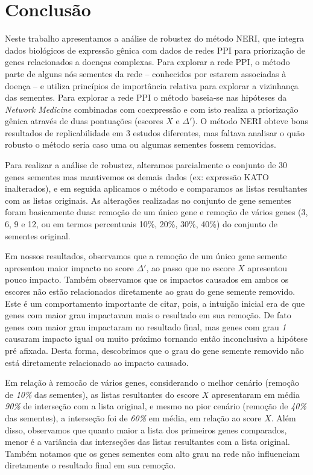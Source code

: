 \chapter{Conclusão}

Neste trabalho apresentamos a análise de robustez do método NERI, que integra dados biológicos de expressão gênica com dados de redes PPI para priorização de genes relacionados a doenças complexas.
Para explorar a rede PPI, o método parte de alguns nós sementes da rede -- conhecidos por estarem associadas à doença -- e utiliza princípios de importância relativa para explorar a vizinhança das sementes. 
Para explorar a rede PPI o método baseia-se nas hipóteses da \textsl{Network Medicine} combinadas com coexpressão e com isto realiza a priorização gênica através de duas pontuações (escores $X$ e $\Delta'$).
O método NERI obteve bons resultados de replicabilidade em 3 estudos diferentes, mas faltava analisar o quão robusto o método seria caso uma ou algumas sementes fossem removidas.

Para realizar a análise de robustez, alteramos parcialmente o conjunto de 30 genes sementes mas mantivemos os demais dados (ex: expressão KATO inalterados), e em seguida aplicamos o método e comparamos as listas resultantes com as listas originais.
As alterações realizadas no conjunto de gene sementes foram basicamente duas: remoção de um único gene e remoção de vários genes (3, 6, 9 e 12, ou em termos percentuais 10\%, 20\%, 30\%, 40\%) do conjunto de sementes original. 


Em nossos resultados, observamos que a remoção de um único gene semente apresentou maior impacto no score $\Delta'$, ao passo que no escore $X$ apresentou pouco impacto.
Também observamos que os impactos causados em ambos os escores não estão relacionados diretamente ao grau do gene semente removido.
Este é um comportamento importante de citar, pois, a intuição inicial era de que genes com maior grau impactavam mais o resultado em sua remoção. De fato genes com maior grau impactaram no resultado final, mas genes com grau \textsl{1} causaram impacto igual ou muito próximo tornando então inconclusiva a hipótese pré afixada. Desta forma, descobrimos que o grau do gene semente removido não está diretamente relacionado ao impacto causado.


Em relação à remocão de vários genes, considerando o melhor cenário (remoção de \textsl{10\%} das sementes), as listas resultantes do escore $X$ apresentaram em média \textsl{90\%} de interseção com a lista original, e mesmo no pior cenário (remoção de \textsl{40\%} das sementes), a interseção foi de \textsl{60\%} em média, em relação ao score $X$. 
Além disso, observamos  que quanto maior a lista dos primeiros genes comparados, menor é a variância das interseções das listas resultantes com a lista original. Também notamos que os genes sementes com alto grau na rede não influenciam diretamente o resultado final em sua remoção.

